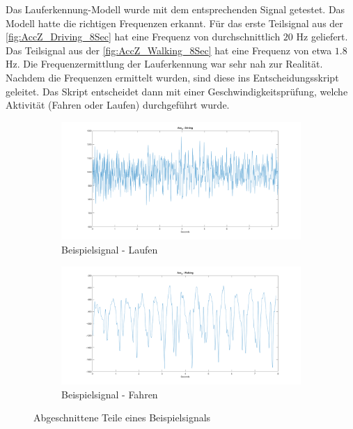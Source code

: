 Das Lauferkennung-Modell wurde mit dem entsprechenden Signal getestet. Das Modell hatte die richtigen Frequenzen erkannt.
Für das erste Teilsignal aus der \autoref{fig:AccZ_Driving_8Sec} hat eine Frequenz von durchschnittlich $20$ Hz geliefert. Das Teilsignal aus der \autoref{fig:AccZ_Walking_8Sec} hat eine Frequenz von etwa $1.8$ Hz. Die Frequenzermittlung der Lauferkennung war sehr nah zur Realität.
Nachdem die Frequenzen ermittelt wurden, sind diese ins Entscheidungsskript geleitet. Das Skript entscheidet dann mit einer Geschwindigkeitsprüfung, welche Aktivität (Fahren oder Laufen) durchgeführt wurde.


\begin{figure}[H]
	\centering
	\begin{subfigure}{\textwidth}
		\centering
		\includegraphics[width=\textwidth]{Bilder/AccZ_Driving_8Sec.png}
		\caption{Beispielsignal - Laufen}
		\label{fig:AccZ_Driving_8Sec}
	\end{subfigure}
	\hfill
	\begin{subfigure}{\textwidth}
		\centering
		\includegraphics[width=\textwidth]{Bilder/AccZ_Walking_8Sec.png}
		\caption{Beispielsignal - Fahren}
		\label{fig:AccZ_Walking_8Sec}
	\end{subfigure}
	\caption{Abgeschnittene Teile eines Beispielsignals}
	\label{fig:AbschnitteBeispielsignal}
\end{figure}



